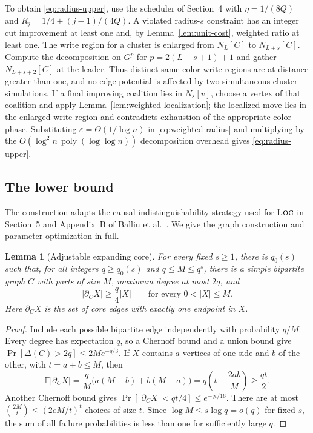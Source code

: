 \documentclass[11pt]{article}
\newtheorem{lemma}[theorem]{Lemma}
\theoremstyle{definition}
\theoremstyle{remark}
\newcommand{\poly}{\operatorname{poly}}
\newcommand{\eps}{\varepsilon}
\newcommand{\N}{N}
\newcommand{\LOC}{\textnormal{\textsc{Loc}}}
\begin{document}
To obtain \eqref{eq:radius-upper}, use the scheduler of Section~4 with
$\eta=1/(8Q)$ and $R_j=1/4+(j-1)/(4Q)$.  A violated radius-$s$ constraint has an
integer cut improvement at least one and, by Lemma~\ref{lem:unit-cost}, weighted
ratio at least one.  The write region for a cluster is enlarged from $\N_L[C]$ to
$\N_{L+s}[C]$.  Compute the decomposition on
$G^p$ for $p=2(L+s+1)+1$ and gather $\N_{L+s+2}[C]$ at the leader.  Thus distinct
same-color write regions are at distance greater than one, and no edge potential is
affected by two simultaneous cluster simulations.  If a final improving coalition
lies in $\N_s[v]$, choose a vertex of that coalition and apply
Lemma~\ref{lem:weighted-localization}; the localized move lies in the enlarged write
region and contradicts exhaustion of the appropriate color phase.  Substituting
$\eps=\Theta(1/\log n)$ in
\eqref{eq:weighted-radius} and multiplying by the $O(\log^2 n\,\poly(\log\log n))$
decomposition overhead gives \eqref{eq:radius-upper}.

\subsection{The lower bound}

The construction adapts the causal indistinguishability strategy used for $\LOC$ in
Section~5 and Appendix~B of Balliu et al.~\cite{BalliuEtAl2026}.  We give the graph
construction and parameter optimization in full.

\begin{lemma}[Adjustable expanding core]\label{lem:core}
For every fixed $s\geq1$, there is $q_0(s)$ such that, for all integers
$q\geq q_0(s)$ and $q\leq M\leq q^s$, there is a simple bipartite graph $C$ with
parts of size $M$, maximum degree at most $2q$, and
\[
 |\partial_C X|\geq \frac q4|X|
 \qquad\text{for every }0<|X|\leq M.
\]
Here $\partial_C X$ is the set of core edges with exactly one endpoint in $X$.
\end{lemma}

\begin{proof}
Include each possible bipartite edge independently with probability $q/M$.  Every
degree has expectation $q$, so a Chernoff bound and a union bound give
$\Pr[\Delta(C)>2q]\leq2M e^{-q/3}$.  If $X$ contains $a$ vertices of one side and
$b$ of the other, with $t=a+b\leq M$, then
\[
 \mathbb E|\partial_CX|
 =\frac qM\bigl(a(M-b)+b(M-a)\bigr)
 =q\left(t-\frac{2ab}{M}\right)
 \geq\frac{qt}{2}.
\]
Another Chernoff bound gives
$\Pr[|\partial_CX|<qt/4]\leq e^{-qt/16}$.  There are at most
$\binom{2M}{t}\leq(2eM/t)^t$ choices of size $t$.  Since
$\log M\leq s\log q=o(q)$ for fixed $s$, the sum of all failure probabilities is
less than one for sufficiently large $q$.
\end{proof}
\end{document}
